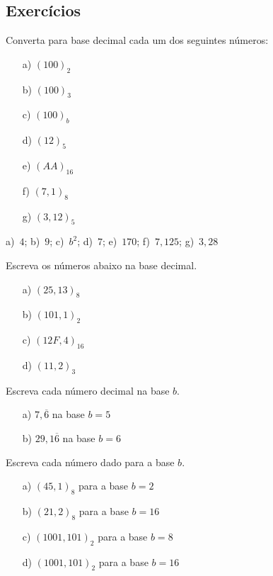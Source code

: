 \subsection*{Exercícios}

\indent 
\begin{exer} Converta para base decimal cada um dos seguintes números:
  \begin{multicols}{4}
    \begin{itemize}
    \item[a)]  $(100)_2$
    \item[b)]  $(100)_3$
    \item[c)]  $(100)_b$
    \item[d)]  $(12)_5$
    \item[e)]  $(AA)_{16}$
    \item[f)]  $(7,1)_8$
    \item[g)]  $(3,12)_5$
    \end{itemize}    
  \end{multicols}
\end{exer}
\begin{resp}
  
    a)~$4$; b)~$9$; c)~$b^2$; d)~$7$; e)~$170$; f)~$7,125$; g)~$3,28$
  
\end{resp}

\begin{exer}Escreva os números abaixo na base decimal.
  \begin{itemize}
  \item[a)] $(25,13)_8$
  \item[b)] $(101,1)_2$
  \item[c)] $(12F,4)_{16}$
  \item[d)] $(11,2)_{3}$
  \end{itemize}
\end{exer}

\begin{exer} Escreva cada número decimal na base $b$.
  \begin{itemize}
  \item[a)] $7,\overline{6}$ na base $b=5$
  \item[b)] $29,1\overline{6}$ na base $b=6$
  \end{itemize}
\end{exer}

\begin{exer} Escreva cada número dado para a base $b$.
  \begin{itemize}
  \item[a)] $(45,1)_8$ para a base $b=2$
  \item[b)] $(21,2)_8$ para a base $b=16$
  \item[c)] $(1001,101)_2$ para a base $b=8$
  \item[d)] $(1001,101)_2$ para a base $b=16$
  \end{itemize}
\end{exer}

